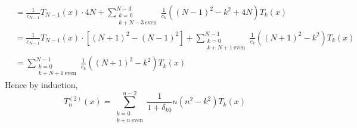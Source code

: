 \documentclass[a4paper,8pt]{article}
\begin{document}
\begin{enumerate}[label=Q\arabic	*.]
\begin{align}
&= \frac{1}{c_{N-1}} T_{N-1}(x) \cdot 4N + \sum\limits^{N-3}_{\substack{k = 0 \\ k + N - 3 \ \text{even}}} \frac{1}{c_k} ((N-1)^2 - k^2 + 4N) T_k(x) \nonumber \\
&= \frac{1}{c_{N-1}} T_{N-1}(x) \cdot [(N+1)^2 - (N-1)^2] + \sum\limits^{N-1}_{\substack{k = 0 \\ k + N + 1 \ \text{even}}} \frac{1}{c_k} ((N+1)^2 - k^2) T_k(x) \nonumber \\
&= \sum\limits^{N-1}_{\substack{k = 0 \\ k + N + 1 \ \text{even}}} \frac{1}{c_k} ((N+1)^2 - k^2) T_k(x) \nonumber
\end{align}
Hence by induction,
\begin{equation}
T^{(2)}_{n} (x) = \sum\limits^{n-2}_{\substack{k = 0 \\ k + n \ \text{even}}} \frac{1}{1 + \delta_{k0}} n(n^2 - k^2) T_k(x) \nonumber
\end{equation}
\end{enumerate}
\end{document}
